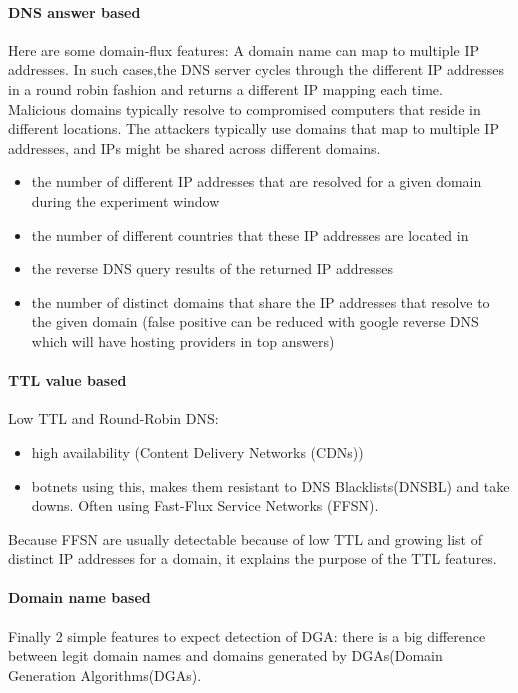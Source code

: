 \paragraph{DNS answer based}
Here are some domain-flux features: A domain name can map to multiple IP addresses. In such cases,the DNS server cycles through the different IP addresses in a round robin fashion and returns a different IP mapping each time. \\
Malicious domains typically resolve to compromised computers that reside in different locations. The attackers typically use domains that map to multiple IP addresses, and IPs might be shared across different domains.
\begin{itemize}[noitemsep]
\item the number of different IP addresses that are resolved for a given domain during the experiment window
\item the number of different countries that these IP addresses are located in
\item the reverse DNS query results of the returned IP addresses
\item the number of distinct domains that share the IP addresses that resolve to the given domain (false positive can be reduced with google reverse DNS which will have hosting providers in top answers)
\end{itemize}
\paragraph{TTL value based}
Low TTL and Round-Robin DNS: \\
\begin{itemize}[noitemsep]
\item high availability (Content Delivery Networks (CDNs))
\item botnets using this, makes them resistant to DNS Blacklists(DNSBL) and take downs. Often using Fast-Flux Service Networks (FFSN).
\end{itemize}
Because FFSN are usually detectable because of low TTL and growing list of distinct IP addresses for a domain, it explains the purpose of the TTL features.
\paragraph{Domain name based}
Finally 2 simple features to expect detection of DGA: there is a big difference between legit domain names and domains generated by DGAs(Domain Generation Algorithms(DGAs).

